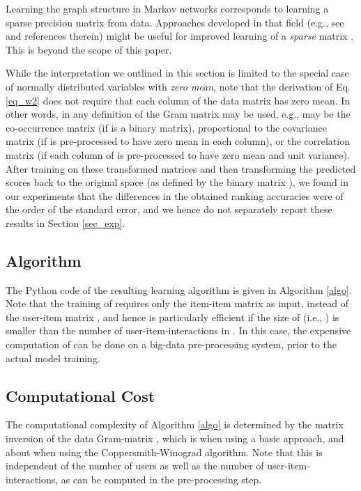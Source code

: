 \documentclass[sigconf]{acmart}
\newcommand{\sae}{}
\begin{document}
Learning the graph structure in Markov networks  corresponds to learning a sparse precision matrix from data. Approaches developed in that field (e.g., see \cite{schmidtthesis} and references therein) might be useful for improved learning of a \emph{sparse} matrix . This is beyond the scope of this paper. 

While the interpretation we outlined in this section is limited to the special case of normally distributed 
variables with \emph{zero mean}, note that the derivation of Eq. \ref{eq_w2} does not require that each column of the data matrix  has zero mean. In other words, in \sae{}  any definition of  the Gram matrix  may be used, e.g.,  may be the co-occurrence matrix (if  is a binary matrix), proportional to the covariance matrix (if  is pre-processed to have zero mean in each column), or the correlation matrix (if each column of  is pre-processed to have zero mean and unit variance). After training \sae{}  on  these transformed matrices  and then transforming the predicted scores back to the original space (as defined by the binary matrix ), we found in our experiments that the differences in the obtained ranking accuracies were of the order of the standard error, and we hence do not separately report these results in Section \ref{sec_exp}. 


  

\subsection{Algorithm}
\label{sec_algo}
The Python code of the resulting learning algorithm is given  in Algorithm \ref{algo}. 
Note that the training of \sae{}  requires only the item-item matrix   as input, instead of the user-item matrix , and  hence is particularly efficient if the size of  (i.e., ) is smaller than the number of user-item-interactions in . In this case, the expensive computation of  can be done on a big-data pre-processing system, prior to the actual model training. 



\subsection{Computational Cost}
\label{sec_complexity}
The computational complexity of Algorithm \ref{algo} is determined by the matrix inversion of the data Gram-matrix  , which is  when using a basic approach, and about  when using the Coppersmith-Winograd algorithm. Note that this is independent of the number of users as well as the number of user-item-interactions, as  can be computed in the pre-processing step. 
\end{document}

